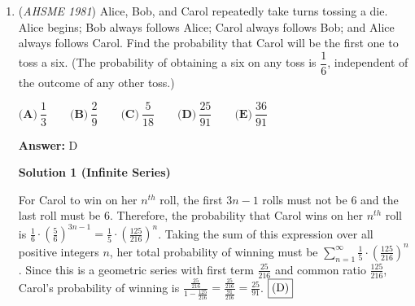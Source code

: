 \begin{enumerate}
 
 \[\begin{cases}198=-\frac{3b^2}4+9c^2\\330=5b^2-\frac{75c^2}{4}\end{cases}.\]

 Thus, we have:

 
 \[\begin{cases}264=-b^2+12c^2\\264=4b^2-15c^2\end{cases}.\]

 Therefore, $5b^2=27c^2$, so $b^2=\frac{27c^2}5$, thus our first equation from earlier gives $264=\frac{33c^2}{5}$, so $c^2=40$, thus $b^2=216$. So, $c<b$ and the answer to the original problem is $c=\sqrt{40}=\boxed{2\sqrt{10}~\textbf{(A)}}$.

 



\textbf{Solution 2}

To keep the calculations simple, use a variation of stewart's formula for an angle bisector, given by: $bc=d^2+mn$.

 Using this formula and letting $AD=d$ and $AE=e$, we have $AB=2e/3$ and $AC=2d$.

 Use stewart's to obtain a system of equations, where:

 $2e^2/3 = d^2 + 6$, and

 $2d^2 = e^2 + 18$.

 Solve to get $d^2 = 54$ and $e^2 = 90$. After comparison, $2d^2 > 2e^2/3$ and we have

 $2/3 * sqrt(90) = sqrt(40) = 2sqrt(10)$



	\item (\textit{AHSME 1981}) Alice, Bob, and Carol repeatedly take turns tossing a die. Alice begins; Bob always follows Alice; Carol always follows Bob; and Alice always follows Carol. Find the probability that Carol will be the first one to toss a six. (The probability of obtaining a six on any toss is $\dfrac{1}{6}$, independent of the outcome of any other toss.)


 $\textbf{(A)}\ \dfrac{1}{3}\qquad \textbf{(B)}\ \dfrac{2}{9}\qquad \textbf{(C)}\ \dfrac{5}{18}\qquad \textbf{(D)}\ \dfrac{25}{91}\qquad \textbf{(E)}\ \dfrac{36}{91}$

 \textbf{Answer: }D



\textbf{Solution 1 (Infinite Series)}

For Carol to win on her $n^{th}$ roll, the first $3n-1$ rolls must not be $6$ and the last roll must be $6$.  Therefore, the probability that Carol wins on her $n^{th}$ roll is $\frac{1}{6} \cdot \left(\frac{5}{6}\right)^{3n-1} = \frac{1}{5} \cdot \left(\frac{125}{216}\right)^{n}$.  Taking the sum of this expression over all positive integers $n$, her total probability of winning must be $\sum_{n=1}^{\infty} \frac{1}{5} \cdot \left(\frac{125}{216}\right)^{n}$.  Since this is a geometric series with first term $\frac{25}{216}$ and common ratio $\frac{125}{216}$, Carol's probability of winning is  $\frac{\frac{25}{216}}{1-\frac{125}{216}}=\frac{\frac{25}{216}}{\frac{91}{216}}=\frac{25}{91}$. $\fbox{(D)}$





\end{enumerate}
